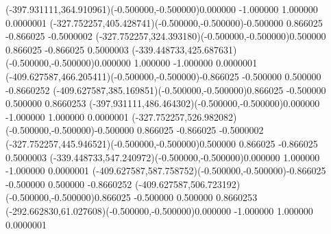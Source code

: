\color{ASYcolor}
\fontsize{12.000000}{14.400000}\selectfont
\ASYalignT(-397.931111,364.910961)(-0.500000,-0.500000){0.000000 -1.000000 1.000000 0.000000}{1}%
\color{ASYcolor}
\fontsize{12.000000}{14.400000}\selectfont
\ASYalignT(-327.752257,405.428741)(-0.500000,-0.500000){-0.500000 0.866025 -0.866025 -0.500000}{2}%
\color{ASYcolor}
\fontsize{12.000000}{14.400000}\selectfont
\ASYalignT(-327.752257,324.393180)(-0.500000,-0.500000){0.500000 0.866025 -0.866025 0.500000}{3}%
\color{ASYcolor}
\fontsize{12.000000}{14.400000}\selectfont
\ASYalignT(-339.448733,425.687631)(-0.500000,-0.500000){0.000000 1.000000 -1.000000 0.000000}{1}%
\color{ASYcolor}
\fontsize{12.000000}{14.400000}\selectfont
\ASYalignT(-409.627587,466.205411)(-0.500000,-0.500000){-0.866025 -0.500000 0.500000 -0.866025}{2}%
\color{ASYcolor}
\fontsize{12.000000}{14.400000}\selectfont
\ASYalignT(-409.627587,385.169851)(-0.500000,-0.500000){0.866025 -0.500000 0.500000 0.866025}{3}%
\color{ASYcolor}
\fontsize{12.000000}{14.400000}\selectfont
\ASYalignT(-397.931111,486.464302)(-0.500000,-0.500000){0.000000 -1.000000 1.000000 0.000000}{1}%
\color{ASYcolor}
\fontsize{12.000000}{14.400000}\selectfont
\ASYalignT(-327.752257,526.982082)(-0.500000,-0.500000){-0.500000 0.866025 -0.866025 -0.500000}{2}%
\color{ASYcolor}
\fontsize{12.000000}{14.400000}\selectfont
\ASYalignT(-327.752257,445.946521)(-0.500000,-0.500000){0.500000 0.866025 -0.866025 0.500000}{3}%
\color{ASYcolor}
\fontsize{12.000000}{14.400000}\selectfont
\ASYalignT(-339.448733,547.240972)(-0.500000,-0.500000){0.000000 1.000000 -1.000000 0.000000}{1}%
\color{ASYcolor}
\fontsize{12.000000}{14.400000}\selectfont
\ASYalignT(-409.627587,587.758752)(-0.500000,-0.500000){-0.866025 -0.500000 0.500000 -0.866025}{2}%
\color{ASYcolor}
\fontsize{12.000000}{14.400000}\selectfont
\ASYalignT(-409.627587,506.723192)(-0.500000,-0.500000){0.866025 -0.500000 0.500000 0.866025}{3}%
\color{ASYcolor}
\fontsize{12.000000}{14.400000}\selectfont
\ASYalignT(-292.662830,61.027608)(-0.500000,-0.500000){0.000000 -1.000000 1.000000 0.000000}{1}%
\color{ASYcolor}
